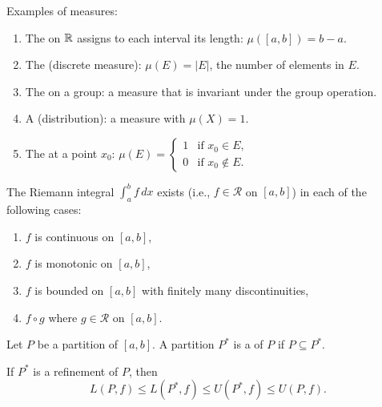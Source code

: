 \documentclass[../master/master.tex]{subfiles}
\begin{document}
\begin{example}
Examples of measures:
\begin{enumerate}[label=(\roman*)]
    \item The  on $\mathbb{R}$ assigns to each interval its length: $\mu([a,b]) = b - a$.
    \item The  (discrete measure): $\mu(E) = |E|$, the number of elements in $E$.
    \item The  on a group: a measure that is invariant under the group operation.
    \item A  (distribution): a measure with $\mu(X) = 1$.
    \item The  at a point $x_0$: $\mu(E) = \begin{cases} 1 & \text{if } x_0 \in E, \\ 0 & \text{if } x_0 \notin E. \end{cases}$
\end{enumerate}
\end{example}

\begin{theorem}
The Riemann integral $\int_a^b f \, dx$ exists (i.e., $f \in \mathscr{R}$ on $[a,b]$) in each of the following cases:
\begin{enumerate}[label=(\roman*)]
    \item $f$ is continuous on $[a,b]$,
    \item $f$ is monotonic on $[a,b]$,
    \item $f$ is bounded on $[a,b]$ with finitely many discontinuities,
    \item $f \circ g$ where $g \in \mathscr{R}$ on $[a,b]$.
\end{enumerate}
\end{theorem}

\begin{definition}
Let $P$ be a partition of $[a,b]$. A partition $P^*$ is a  of $P$ if $P \subseteq P^*$.
\end{definition}

\begin{theorem}
If $P^*$ is a refinement of $P$, then
\[
L(P, f) \leq L(P^*, f) \leq U(P^*, f) \leq U(P, f).
\]
\end{theorem}
\end{document}
